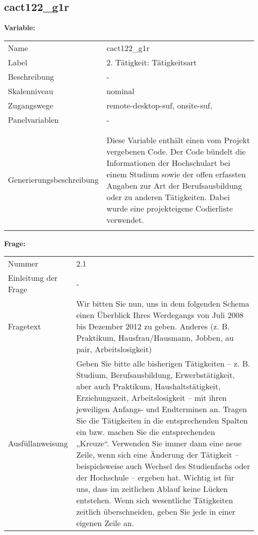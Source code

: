 	
	
	\subsection{cact122\_g1r}
	\label{subSection:cact122_g1r}

	\noindent\textbf{Variable:}\\
		\begin{tabular}{lL{11.3cm}}
			\label{tableVariable:cact122_g1r}
			Name & cact122\_g1r \\
			Label & 2. Tätigkeit: Tätigkeitsart \\
			Beschreibung & - \\
			Skalenniveau & nominal \\
			Zugangswege &
				remote-desktop-suf,
				onsite-suf,
 \\
			Panelvariablen & -
			 \\
			 \\
 \\
					Generierungsbeschreibung & Diese Variable enthält einen vom Projekt vergebenen Code. Der Code bündelt die  Informationen der Hochschulart bei einem Studium sowie der  offen erfassten Angaben zur Art der Berufsausbildung oder zu anderen Tätigkeiten. Dabei wurde eine projekteigene Codierliste verwendet.
				 \\	
			 \\
		\end{tabular}

		\vspace*{1 cm}
		\noindent\textbf{Frage:}\\
		\begin{tabular}{lL{11.3cm}}
			\label{tableQuestion:cact122_g1r}
			Nummer & 2.1 \\
			Einleitung der Frage & - \\
			Fragetext & Wir bitten Sie nun, uns in dem folgenden Schema einen Überblick Ihres Werdegangs von Juli 2008 bis Dezember 2012 zu geben.
Anderes
(z. B. Praktikum, Hausfrau/Hausmann, Jobben, au pair, Arbeitslosigkeit) \\
			Ausfüllanweisung & Geben Sie bitte alle bisherigen Tätigkeiten – z. B. Studium, Berufsausbildung, Erwerbstätigkeit, aber auch Praktikum, Haushaltstätigkeit,
Erziehungszeit, Arbeitslosigkeit – mit ihren jeweiligen Anfangs- und Endterminen an. Tragen Sie die Tätigkeiten in die entsprechenden Spalten ein bzw. machen Sie die entsprechenden „Kreuze“. Verwenden Sie immer dann eine neue Zeile, wenn sich eine Änderung der Tätigkeit – beispielsweise auch Wechsel des Studienfachs oder der Hochschule – ergeben hat. Wichtig ist für uns, dass im zeitlichen Ablauf keine Lücken entstehen. Wenn sich wesentliche Tätigkeiten zeitlich überschneiden, geben Sie jede in einer eigenen Zeile an. \\
		\end{tabular}






